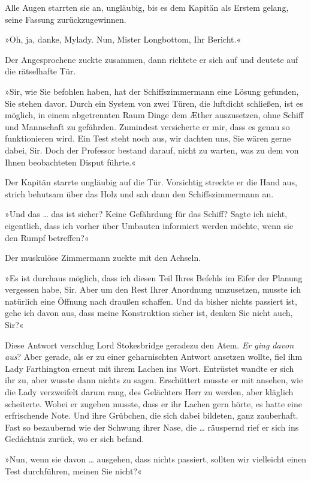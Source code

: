 Alle Augen starrten sie an, ungläubig, bis es dem Kapitän als
Erstem gelang, seine Fassung zurückzugewinnen.

»Oh, ja, danke, Mylady. Nun, Mister Longbottom, Ihr Bericht.«

Der Angesprochene zuckte zusammen, dann richtete er sich auf und
deutete auf die rätselhafte Tür.

»Sir, wie Sie befohlen haben, hat der Schiffszimmermann eine Lösung
gefunden, Sie stehen davor. Durch ein System von zwei Türen, die
luftdicht schließen, ist es möglich, in einem abgetrennten Raum
Dinge dem Æther auszusetzen, ohne Schiff und Mannschaft zu
gefährden. Zumindest versicherte er mir, dass es genau so
funktionieren wird. Ein Test steht noch aus, wir dachten uns, Sie
wären gerne dabei, Sir. Doch der Professor bestand darauf, nicht zu
warten, was zu dem von Ihnen beobachteten Disput führte.«

Der Kapitän starrte ungläubig auf die Tür. Vorsichtig streckte er
die Hand aus, strich behutsam über das Holz und sah dann den
Schiffszimmermann an.

»Und das \ldots{} das ist sicher? Keine Gefährdung für das Schiff? Sagte
ich nicht, eigentlich, dass ich vorher über Umbauten informiert
werden möchte, wenn sie den Rumpf betreffen?«

Der muskulöse Zimmermann zuckte mit den Achseln.

»Es ist durchaus möglich, dass ich diesen Teil Ihres Befehls im
Eifer der Planung vergessen habe, Sir. Aber um den Rest Ihrer
Anordnung umzusetzen, musste ich natürlich eine Öffnung nach
draußen schaffen. Und da bisher nichts passiert ist, gehe ich davon
aus, dass meine Konstruktion sicher ist, denken Sie nicht auch,
Sir?«

Diese Antwort verschlug Lord Stokesbridge geradezu den Atem.
\emph{Er ging davon aus}? Aber gerade, als er zu einer
geharnischten Antwort ansetzen wollte, fiel ihm Lady Farthington
erneut mit ihrem Lachen ins Wort. Entrüstet wandte er sich ihr zu,
aber wusste dann nichts zu sagen. Erschüttert musste er mit
ansehen, wie die Lady verzweifelt darum rang, des Gelächters Herr
zu werden, aber kläglich scheiterte. Wobei er zugeben musste, dass
er ihr Lachen gern hörte, es hatte eine erfrischende Note. Und ihre
Grübchen, die sich dabei bildeten, ganz zauberhaft. Fast so
bezaubernd wie der Schwung ihrer Nase, die \ldots{} räuspernd rief er
sich ins Gedächtnis zurück, wo er sich befand.

»Nun, wenn sie davon \ldots{} ausgehen, dass nichts passiert, sollten
wir vielleicht einen Test durchführen, meinen Sie nicht?«

